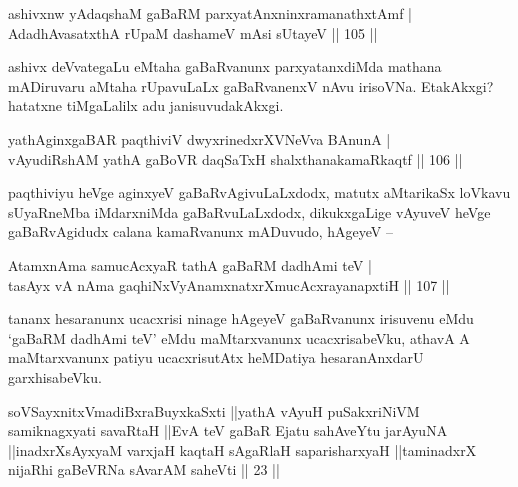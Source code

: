 \begin{shl}
ashivxnw yAdaqshaM gaBaRM parxyatAnxninxramanathxtAmf | \\
AdadhAvasatxthA rUpaM dashameV mAsi sUtayeV \hfill|| 105 || 
\end{shl}

\begin{artha}
ashivx deVvategaLu eMtaha gaBaRvanunx parxyatanxdiMda mathana 
mADiruvaru aMtaha rUpavuLaLx gaBaRvanenxV nAvu irisoVNa. EtakAkxgi? 
hatatxne tiMgaLalilx adu janisuvudakAkxgi.
\end{artha}


\begin{shl}
yathA\s ginxgaBAR paqthiviV dwyxrinedxrXVNeVva BAnunA | \\
vAyudiRshAM yathA gaBoVR daqSaTxH shalxthanakamaRkaqtf \hfill|| 106 || 
\end{shl}

\begin{artha}
paqthiviyu heVge aginxyeV gaBaRvAgivuLaLxdodx, matutx aMtarikaSx 
loVkavu sUyaRneMba iMdarxniMda gaBaRvuLaLxdodx, dikukxgaLige vAyuveV
heVge gaBaRvAgidudx calana kamaRvanunx mADuvudo, hAgeyeV {\rm --}
\end{artha}


\begin{shl}
AtamxnAma samucAcxyaR tathA gaBaRM dadhAmi teV | \\
tasAyx vA nAma gaqhiNxVyAnamxnatxrXmucAcxrayanapxtiH \hfill|| 107 ||  
\end{shl}

\begin{artha}
tananx hesaranunx ucacxrisi ninage hAgeyeV gaBaRvanunx irisuvenu eMdu 
`gaBaRM dadhAmi teV' eMdu maMtarxvanunx ucacxrisabeVku, athavA A 
maMtarxvanunx patiyu ucacxrisutAtx heMDatiya hesaranAnxdarU 
garxhisabeVku.
\end{artha}

\begin{shl}
soVSayxnitxVmadiBxraBuyxkaSxti ||yathA vAyuH puSakxriNiVM samiknagxyati savaRtaH ||EvA teV gaBaR Ejatu sahAveYtu jarAyuNA ||inadxrXsAyxyaM varxjaH kaqtaH sAgaRlaH saparisharxyaH ||taminadxrX nijaRhi gaBeVRNa sAvarAM saheVti || 23 ||
\end{shl}



